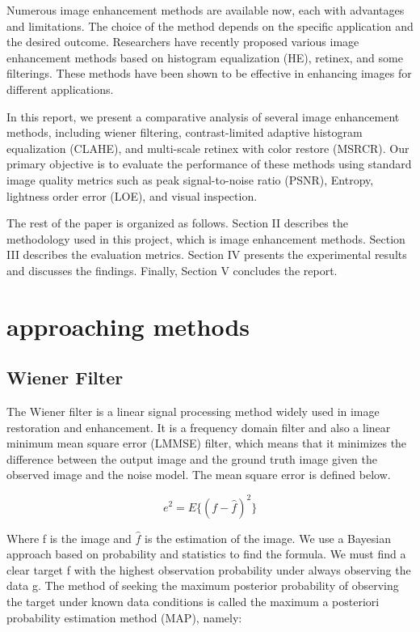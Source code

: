 \documentclass[conference]{IEEEtran}
\begin{document}
Numerous image enhancement methods are available now, each with advantages and limitations. The choice of the method depends on the specific application and the desired outcome. Researchers have recently proposed various image enhancement methods based on histogram equalization (HE), retinex, and some filterings. These methods have been shown to be effective in enhancing images for different applications.

In this report, we present a comparative analysis of several image enhancement methods, including wiener filtering, contrast-limited adaptive histogram equalization (CLAHE), and multi-scale retinex with color restore (MSRCR). Our primary objective is to evaluate the performance of these methods using standard image quality metrics such as peak signal-to-noise ratio (PSNR), Entropy, lightness order error (LOE), and visual inspection. 

The rest of the paper is organized as follows. Section II describes the methodology used in this project, which is image enhancement methods. Section III describes the evaluation metrics. Section IV presents the experimental results and discusses the findings. Finally, Section V concludes the report.

\section{approaching methods}

\subsection{Wiener Filter}
The Wiener filter is a linear signal processing method widely used in image restoration and enhancement. It is a frequency domain filter and also a linear minimum mean square error (LMMSE) filter, which means that it minimizes the difference between the output image and the ground truth image given the observed image and the noise model. The mean square error is defined below.

\begin{equation}
e^2 = E\{ (f-\hat{f})^2\}  \label{eq7}
\end{equation}

Where f is the image and $\hat{f}$ is the estimation of the image. We use a Bayesian approach based on probability and statistics to find the formula. We must find a clear target f with the highest observation probability under always observing the data g. The method of seeking the maximum posterior probability of observing the target under known data conditions is called the maximum a posteriori probability estimation method (MAP), namely:
\end{document}
